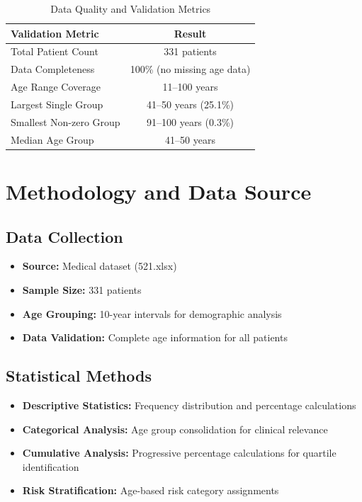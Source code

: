 \documentclass[10pt]{article}
\begin{document}
\begin{table}[h!]
\centering
\caption{Data Quality and Validation Metrics}
\begin{tabular}{l|c}
\toprule
\rowcolor{headercolor}
\textbf{Validation Metric} & \textbf{Result} \\
\midrule
Total Patient Count & 331 patients \\
\rowcolor{altrowcolor}
Data Completeness & 100\% (no missing age data) \\
Age Range Coverage & 11--100 years \\
\rowcolor{altrowcolor}
Largest Single Group & 41--50 years (25.1\%) \\
Smallest Non-zero Group & 91--100 years (0.3\%) \\
\rowcolor{altrowcolor}
Median Age Group & 41--50 years \\
\bottomrule
\end{tabular}
\end{table}

\section{Methodology and Data Source}

\subsection{Data Collection}
\begin{itemize}
\item \textbf{Source:} Medical dataset (521.xlsx)
\item \textbf{Sample Size:} 331 patients
\item \textbf{Age Grouping:} 10-year intervals for demographic analysis
\item \textbf{Data Validation:} Complete age information for all patients
\end{itemize}

\subsection{Statistical Methods}
\begin{itemize}
\item \textbf{Descriptive Statistics:} Frequency distribution and percentage calculations
\item \textbf{Categorical Analysis:} Age group consolidation for clinical relevance
\item \textbf{Cumulative Analysis:} Progressive percentage calculations for quartile identification
\item \textbf{Risk Stratification:} Age-based risk category assignments
\end{itemize}
\end{document}
